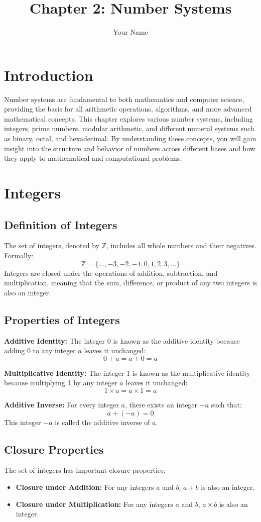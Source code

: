\documentclass{article}
\title{Chapter 2: Number Systems}
\author{Your Name}
\date{}
\begin{document}
\maketitle

\section{Introduction}
Number systems are fundamental to both mathematics and computer science, providing the basis for all arithmetic operations, algorithms, and more advanced mathematical concepts. This chapter explores various number systems, including integers, prime numbers, modular arithmetic, and different numeral systems such as binary, octal, and hexadecimal. By understanding these concepts, you will gain insight into the structure and behavior of numbers across different bases and how they apply to mathematical and computational problems.

\section{Integers}
\subsection{Definition of Integers}
The set of integers, denoted by \( \mathbb{Z} \), includes all whole numbers and their negatives. Formally:
\[
\mathbb{Z} = \{ \ldots, -3, -2, -1, 0, 1, 2, 3, \ldots \}
\]
Integers are closed under the operations of addition, subtraction, and multiplication, meaning that the sum, difference, or product of any two integers is also an integer.

\subsection{Properties of Integers}
\textbf{Additive Identity:} The integer 0 is known as the additive identity because adding 0 to any integer \( a \) leaves it unchanged:
\[
0 + a = a + 0 = a
\]

\textbf{Multiplicative Identity:} The integer 1 is known as the multiplicative identity because multiplying 1 by any integer \( a \) leaves it unchanged:
\[
1 \times a = a \times 1 = a
\]

\textbf{Additive Inverse:} For every integer \( a \), there exists an integer \( -a \) such that:
\[
a + (-a) = 0
\]
This integer \( -a \) is called the additive inverse of \( a \).

\subsection{Closure Properties}
The set of integers has important closure properties:
\begin{itemize}
    \item \textbf{Closure under Addition:} For any integers \( a \) and \( b \), \( a + b \) is also an integer.
    \item \textbf{Closure under Multiplication:} For any integers \( a \) and \( b \), \( a \times b \) is also an integer.
\end{itemize}
\end{document}
